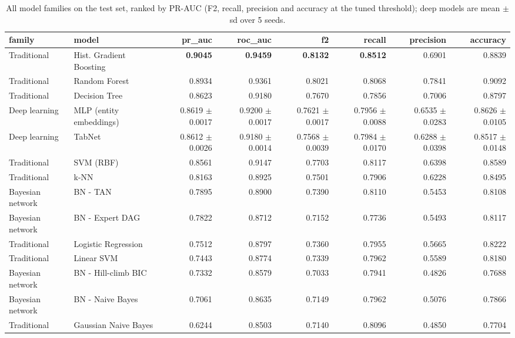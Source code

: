 \begin{table}[H]
\centering
\small
\begin{adjustbox}{max width=\linewidth}
\begin{tabular}{llrrrrrr}
\toprule
family & model & pr\_auc & roc\_auc & f2 & recall & precision & accuracy \\
\midrule
Traditional & Hist. Gradient Boosting & \textbf{0.9045} & \textbf{0.9459} & \textbf{0.8132} & \textbf{0.8512} & 0.6901 & 0.8839 \\
Traditional & Random Forest & 0.8934 & 0.9361 & 0.8021 & 0.8068 & 0.7841 & 0.9092 \\
Traditional & Decision Tree & 0.8623 & 0.9180 & 0.7670 & 0.7856 & 0.7006 & 0.8797 \\
Deep learning & MLP (entity embeddings) & 0.8619 $\pm$ 0.0017 & 0.9200 $\pm$ 0.0017 & 0.7621 $\pm$ 0.0017 & 0.7956 $\pm$ 0.0088 & 0.6535 $\pm$ 0.0283 & 0.8626 $\pm$ 0.0105 \\
Deep learning & TabNet & 0.8612 $\pm$ 0.0026 & 0.9180 $\pm$ 0.0014 & 0.7568 $\pm$ 0.0039 & 0.7984 $\pm$ 0.0170 & 0.6288 $\pm$ 0.0398 & 0.8517 $\pm$ 0.0148 \\
Traditional & SVM (RBF) & 0.8561 & 0.9147 & 0.7703 & 0.8117 & 0.6398 & 0.8589 \\
Traditional & k-NN & 0.8163 & 0.8925 & 0.7501 & 0.7906 & 0.6228 & 0.8495 \\
Bayesian network & BN - TAN & 0.7895 & 0.8900 & 0.7390 & 0.8110 & 0.5453 & 0.8108 \\
Bayesian network & BN - Expert DAG & 0.7822 & 0.8712 & 0.7152 & 0.7736 & 0.5493 & 0.8117 \\
Traditional & Logistic Regression & 0.7512 & 0.8797 & 0.7360 & 0.7955 & 0.5665 & 0.8222 \\
Traditional & Linear SVM & 0.7443 & 0.8774 & 0.7339 & 0.7962 & 0.5589 & 0.8180 \\
Bayesian network & BN - Hill-climb BIC & 0.7332 & 0.8579 & 0.7033 & 0.7941 & 0.4826 & 0.7688 \\
Bayesian network & BN - Naive Bayes & 0.7061 & 0.8635 & 0.7149 & 0.7962 & 0.5076 & 0.7866 \\
Traditional & Gaussian Naive Bayes & 0.6244 & 0.8503 & 0.7140 & 0.8096 & 0.4850 & 0.7704 \\
\bottomrule
\end{tabular}
\end{adjustbox}
\caption{All model families on the test set, ranked by PR-AUC (F2, recall, precision and accuracy at the tuned threshold); deep models are mean $\pm$ sd over 5 seeds.}
\label{tab:overall}
\end{table}

